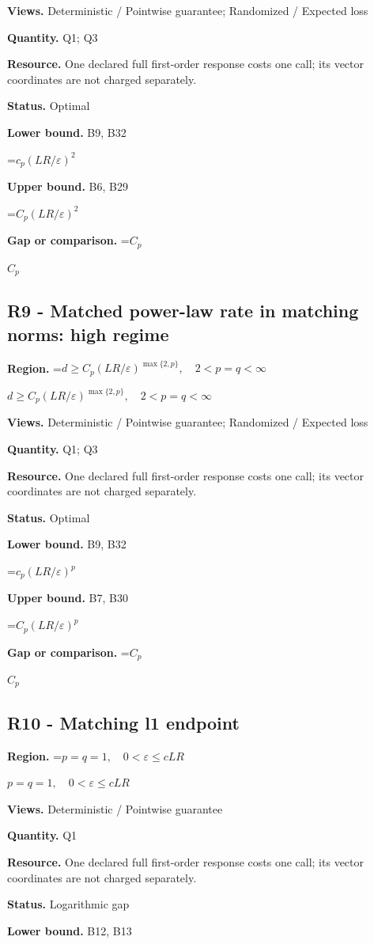 \documentclass[10pt,a4paper]{article}
\newcommand{\AtlasMath}[1]{\par\begingroup\centering\setbox0=\hbox{$\displaystyle #1$}\ifdim\wd0>1.4\linewidth\typeout{ATLAS WIDE FORMULA: \the\wd0}\fi\ifdim\wd0>\linewidth\resizebox{\linewidth}{!}{\box0}\else\box0\fi\par\endgroup}
\newcommand{\AtlasInlineMath}[1]{\begingroup\setbox0=\hbox{$#1$}\ifdim\wd0>.4\linewidth\endgroup\AtlasMath{#1}\else\endgroup$#1$\fi}
\begin{document}
\textbf{Views.} Deterministic / Pointwise guarantee; Randomized / Expected loss

\textbf{Quantity.} Q1; Q3

\textbf{Resource.} One declared full first-order response costs one call; its vector coordinates are not charged separately.

\textbf{Status.} Optimal

\textbf{Lower bound.} B9, B32

\AtlasMath{c_p(LR/\varepsilon)^2}
\textbf{Upper bound.} B6, B29

\AtlasMath{C_p(LR/\varepsilon)^2}
\textbf{Gap or comparison.} \AtlasInlineMath{C_p}

\subsection{R9 - Matched power-law rate in matching norms: high regime}
\textbf{Region.} \AtlasInlineMath{d\ge C_p(LR/\varepsilon)^{\max\{2,p\}},\quad2<p=q<\infty}

\textbf{Views.} Deterministic / Pointwise guarantee; Randomized / Expected loss

\textbf{Quantity.} Q1; Q3

\textbf{Resource.} One declared full first-order response costs one call; its vector coordinates are not charged separately.

\textbf{Status.} Optimal

\textbf{Lower bound.} B9, B32

\AtlasMath{c_p(LR/\varepsilon)^p}
\textbf{Upper bound.} B7, B30

\AtlasMath{C_p(LR/\varepsilon)^p}
\textbf{Gap or comparison.} \AtlasInlineMath{C_p}

\subsection{R10 - Matching l1 endpoint}
\textbf{Region.} \AtlasInlineMath{p=q=1,\quad0<\varepsilon\le cLR}

\textbf{Views.} Deterministic / Pointwise guarantee

\textbf{Quantity.} Q1

\textbf{Resource.} One declared full first-order response costs one call; its vector coordinates are not charged separately.

\textbf{Status.} Logarithmic gap

\textbf{Lower bound.} B12, B13
\end{document}
